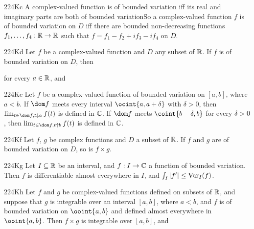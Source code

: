 \spheader 224Kc A complex-valued function is of bounded
variation iff its real and imaginary parts are both of bounded
variationSo a complex-valued function $f$ is of bounded variation on
$D$ iff there are bounded non-decreasing functions
$f_1,\ldots,f_4:\Bbb R\to\Bbb R$ such that
$f=f_1-f_2+if_3-if_4$ on $D$.

\spheader 224Kd Let $f$ be a complex-valued function and $D$ any
subset of $\Bbb R$.   If $f$ is of bounded variation on $D$, then


\noindent for every $a\in\Bbb R$, and



\spheader 224Ke Let $f$ be a complex-valued function of bounded
variation on $[a,b]$, where $a<b$.   If $\dom f$ meets every interval
$\ocint{a,a+\delta}$ with $\delta>0$,   then
 $\lim_{t\in\dom f,t\downarrow a}f(t)$
is defined in $\Bbb C$.   If $\dom f$ meets
$\coint{b-\delta,b}$ for every $\delta>0$, then
$\lim_{t\in\dom f,t\uparrow b}f(t)$
is defined in $\Bbb C$.   

\spheader 224Kf Let $f$, $g$ be complex functions and $D$ a subset
of $\Bbb R$.   If $f$ and $g$ are of bounded variation on $D$, so is
$f\times g$.   

\spheader 224Kg Let $I\subseteq\Bbb R$ be an interval, and
$f:I\to\Bbb C$ a function of bounded variation.   Then $f$ is
differentiable almost everywhere in $I$, and $\int_I|f'|\le\mathop{\text{Var}}_I(f)$.

\spheader 224Kh Let $f$ and $g$ be complex-valued
functions defined on subsets of $\Bbb R$, and suppose that $g$ is
integrable over an interval $[a,b]$, where $a<b$, and $f$ is of bounded
variation on $\ooint{a,b}$ and defined almost everywhere in
$\ooint{a,b}$.   Then $f\times g$ is integrable over $[a,b]$, and

